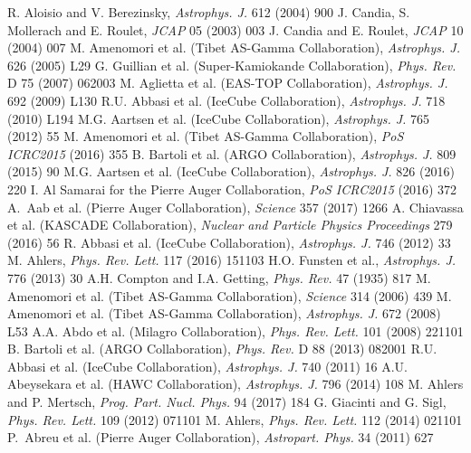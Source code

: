 \documentclass[twoside,12pt]{article}
\begin{document}
\begin{thebibliography}{99}
  R. Aloisio and V. Berezinsky, {\it Astrophys. J.} 612 (2004) 900  %
 J. Candia, S. Mollerach and E. Roulet, {\it JCAP} 05 (2003) 003 %
 J. Candia and E. Roulet, {\it JCAP} 10 (2004) 007 %
  M. Amenomori et al. (Tibet AS-Gamma Collaboration), {\it  Astrophys. J.} 626 (2005) L29
 G. Guillian et al. (Super-Kamiokande Collaboration), {\it Phys. Rev.} D 75 (2007) 062003
  M. Aglietta et al. (EAS-TOP Collaboration), {\it  Astrophys. J.} 692 (2009) L130
  R.U. Abbasi et al. (IceCube Collaboration), {\it  Astrophys. J.} 718 (2010) L194
  M.G. Aartsen et al. (IceCube Collaboration), {\it  Astrophys. J.} 765 (2012) 55
 M. Amenomori et al. (Tibet AS-Gamma Collaboration),  {\it PoS ICRC2015} (2016) 355
 B. Bartoli et al. (ARGO Collaboration), {\it Astrophys. J.} 809 (2015) 90
 M.G. Aartsen et al. (IceCube Collaboration), {\it Astrophys. J.} 826 (2016) 220
 I. Al Samarai for the Pierre Auger Collaboration, {\it PoS ICRC2015} (2016) 372
 A.~Aab et al. (Pierre Auger Collaboration), {\it Science} 357 (2017) 1266
 A. Chiavassa et al. (KASCADE Collaboration), {\it Nuclear and Particle Physics Proceedings} 279 (2016) 56
 R. Abbasi et al. (IceCube Collaboration), {\it Astrophys. J.} 746 (2012) 33
 M. Ahlers, {\it Phys. Rev. Lett.} 117 (2016) 151103
 H.O. Funsten et al., {\it Astrophys. J.} 776 (2013) 30
 A.H. Compton and I.A. Getting, {\it Phys. Rev.} 47 (1935) 817
M. Amenomori et al. (Tibet AS-Gamma Collaboration), {\it Science} 314 (2006) 439
M. Amenomori et al. (Tibet AS-Gamma Collaboration), {\it Astrophys. J.} 672 (2008) L53
 A.A. Abdo et al. (Milagro Collaboration), {\it Phys. Rev. Lett.} 101 (2008) 221101
  B. Bartoli et al. (ARGO Collaboration), {\it Phys. Rev.} D 88 (2013) 082001
  R.U. Abbasi et al. (IceCube Collaboration), {\it Astrophys. J.} 740 (2011) 16
  A.U. Abeysekara et al. (HAWC Collaboration), {\it  Astrophys. J.} 796 (2014) 108
 M. Ahlers and P. Mertsch,  {\it Prog. Part. Nucl. Phys.} 94 (2017) 184
 G. Giacinti and G. Sigl, {\it Phys. Rev. Lett.} 109 (2012) 071101 %
 M. Ahlers, {\it  Phys. Rev. Lett.} 112 (2014) 021101 %
 P.~Abreu et al. (Pierre Auger Collaboration), {\it Astropart. Phys.} 34 (2011) 627

\end{thebibliography}
\end{document}
